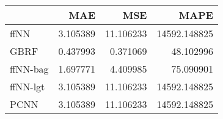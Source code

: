 \begin{tabular}{lrrr}
\toprule
{} &       MAE &        MSE &          MAPE \\
\midrule
ffNN     &  3.105389 &  11.106233 &  14592.148825 \\
GBRF     &  0.437993 &   0.371069 &     48.102996 \\
ffNN-bag &  1.697771 &   4.409985 &     75.090901 \\
ffNN-lgt &  3.105389 &  11.106233 &  14592.148825 \\
PCNN     &  3.105389 &  11.106233 &  14592.148825 \\
\bottomrule
\end{tabular}
